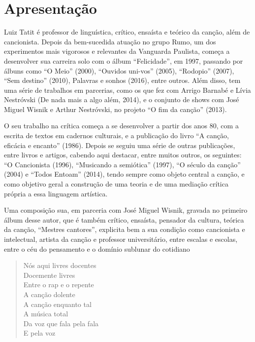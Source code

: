 \chapter{Apresentação}

Luiz Tatit é professor de linguística, crítico, ensaísta e teórico da
canção, além de cancionista. Depois da bem-sucedida atuação no grupo
Rumo, um dos experimentos mais vigorosos e relevantes da Vanguarda
Paulista, começa a desenvolver sua carreira solo com o álbum
``Felicidade'', em 1997, passando por álbuns como ``O Meio'' (2000),
``Ouvidos uni-vos'' (2005), ``Rodopio'' (2007), ``Sem destino'' (2010),
Palavras e sonhos (2016), entre outros. Além disso, tem uma série de
trabalhos em parcerias, como os que fez com Arrigo Barnabé e Lívia
Nestróvski (De nada mais a algo além, 2014), e o conjunto de shows com
José Miguel Wisnik e Arthur Nestróvski, no projeto ``O fim da canção''
(2013).

O seu trabalho na crítica começa a se desenvolver a partir dos anos 80,
com a escrita de textos em cadernos culturais, e a publicação do livro
``A canção, eficácia e encanto'' (1986). Depois se seguiu uma série de
outras publicações, entre livros e artigos, cabendo aqui destacar, entre
muitos outros, os seguintes: ``O Cancionista (1996), ``Musicando a
semiótica'' (1997), ``O século da canção'' (2004) e ``Todos Entoam''
(2014), tendo sempre como objeto central a canção, e como objetivo geral
a construção de uma teoria e de uma mediação crítica própria a essa
linguagem artística.

Uma composição sua, em parceria com José Miguel Wisnik, gravada no
primeiro álbum desse autor, que é também crítico, ensaísta, pensador da
cultura, teórica da canção, ``Mestres cantores'', explicita bem a sua
condição como cancionista e intelectual, artista da canção e professor
universitário, entre escalas e escolas, entre o céu do pensamento e o
domínio sublunar do cotidiano

\begin{verse}
Nós aqui livres docentes\\
Docemente livres\\
Entre o rap e o repente\\
A canção dolente\\
A canção enquanto tal\\
A música total\\
Da voz que fala pela fala\\
E pela voz
\end{verse}

